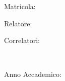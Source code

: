 \begin{titlepage}
\begin{center}
        \normalsize Matricola: \\
        \Large {}
        
        \bigskip
        
        \normalsize Relatore: \\
        \Large {}

 	\normalsize Correlatori: \\
        \Large {}


        \vfill ~ \vfill ~ \vfill
        
        \normalsize Anno Accademico: \\
        \Large {}


                   

    \end{center}        

\end{titlepage} 
